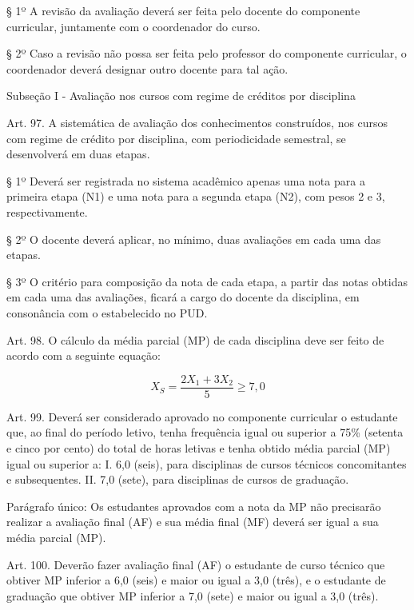 {§ 1º A revisão da avaliação deverá ser feita pelo docente do componente curricular, juntamente com o coordenador do curso.

§ 2º Caso a revisão não possa ser feita pelo professor do componente curricular, o coordenador deverá designar outro docente para tal ação.

\begin{center}
	Subseção I - Avaliação nos cursos com regime de créditos por disciplina
\end{center}

Art. 97. A sistemática de avaliação dos conhecimentos construídos, nos cursos com regime de crédito por disciplina, com periodicidade semestral, se desenvolverá em duas etapas.

§ 1º Deverá ser registrada no sistema acadêmico apenas uma nota para a primeira etapa (N1) e uma nota para a segunda etapa (N2), com pesos 2 e 3, respectivamente.

§ 2º O docente deverá aplicar, no mínimo, duas avaliações em cada uma das etapas.

§ 3º O critério para composição da nota de cada etapa, a partir das notas obtidas em cada uma das avaliações, ficará a cargo do docente da disciplina, em consonância com o estabelecido no PUD.

Art. 98. O cálculo da média parcial (MP) de cada disciplina deve ser feito de acordo com a seguinte equação:

\begin{equation*}
	X_S=\frac{2X_1+3X_2}{5}\geq 7,0
\end{equation*}
\vspace{0,3cm}

Art. 99. Deverá ser considerado aprovado no componente curricular o estudante que, ao final do período letivo, tenha frequência igual ou superior a 75\% (setenta e cinco por cento) do total de horas letivas e tenha obtido média parcial (MP) igual ou superior a:
I. 6,0 (seis), para disciplinas de cursos técnicos concomitantes e subsequentes.
II. 7,0 (sete), para disciplinas de cursos de graduação.

Parágrafo único: Os estudantes aprovados com a nota da MP não precisarão realizar a avaliação final (AF) e sua média final (MF) deverá ser igual a sua média parcial (MP).

Art. 100. Deverão fazer avaliação final (AF) o estudante de curso técnico que obtiver MP inferior a 6,0 (seis) e maior ou igual a 3,0 (três), e o estudante de graduação que obtiver MP inferior a 7,0 (sete) e maior ou igual a 3,0 (três).

}
